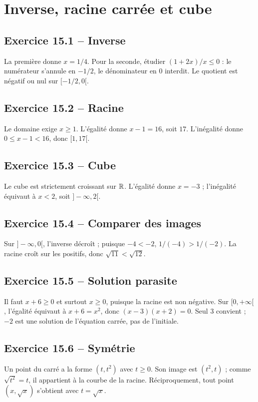 \chapter{Inverse, racine carrée et cube}
\section*{Exercice 15.1 -- Inverse}
La première donne $x=1/4$. Pour la seconde, étudier $(1+2x)/x\leq0$ : le numérateur s'annule en $-1/2$, le dénominateur en $0$ interdit. Le quotient est négatif ou nul sur $[-1/2,0[$.

\section*{Exercice 15.2 -- Racine}
Le domaine exige $x\geq1$. L'égalité donne $x-1=16$, soit $17$. L'inégalité donne $0\leq x-1<16$, donc $[1,17[$.

\section*{Exercice 15.3 -- Cube}
Le cube est strictement croissant sur $\mathbb{R}$. L'égalité donne $x=-3$ ; l'inégalité équivaut à $x<2$, soit $]-\infty,2[$.

\section*{Exercice 15.4 -- Comparer des images}
Sur $]-\infty,0[$, l'inverse décroît ; puisque $-4<-2$, $1/(-4)>1/(-2)$. La racine croît sur les positifs, donc $\sqrt{11}<\sqrt{12}$.

\section*{Exercice 15.5 -- Solution parasite}
Il faut $x+6\geq0$ et surtout $x\geq0$, puisque la racine est non négative. Sur $[0,+\infty[$, l'égalité équivaut à $x+6=x^2$, donc $(x-3)(x+2)=0$. Seul $3$ convient ; $-2$ est une solution de l'équation carrée, pas de l'initiale.

\section*{Exercice 15.6 -- Symétrie}
Un point du carré a la forme $(t,t^2)$ avec $t\geq0$. Son image est $(t^2,t)$ ; comme $\sqrt{t^2}=t$, il appartient à la courbe de la racine. Réciproquement, tout point $(x,\sqrt x)$ s'obtient avec $t=\sqrt x$.

